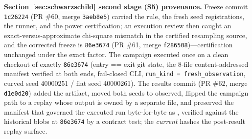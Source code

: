 \textbf{Section~\ref{sec:schwarzschild} second stage (S5) provenance.}
Freeze commit \texttt{1c26224} (PR \#60, merge \texttt{3aeb8e5}) carried
the rule, the fresh seed registrations, the runner, and the power
certification; an execution review then caught an
exact-versus-approximate chi-square mismatch in the certified resampling
source, and the corrected freeze is \texttt{86e3674} (PR \#61, merge
\texttt{f286508})---certification unchanged under the exact factor. The
campaign executed once on a clean checkout of exactly \texttt{86e3674}
(entry == exit git state, the 8-file content-addressed manifest verified
at both ends, fail-closed CLI, \texttt{run\_kind = fresh\_observation},
curved seed 40000251 / flat seed 40000261). The results commit (PR \#62,
merge \texttt{d1e0d20}) added the artifact, moved both seeds to observed,
flipped the campaign path to a replay whose output is owned by a separate
file, and preserved the manifest that governed the executed run
byte-for-byte as
, verified
against the historical blobs at \texttt{86e3674} by a contract test; the
\emph{current}  hashes the
post-result replay surface.

